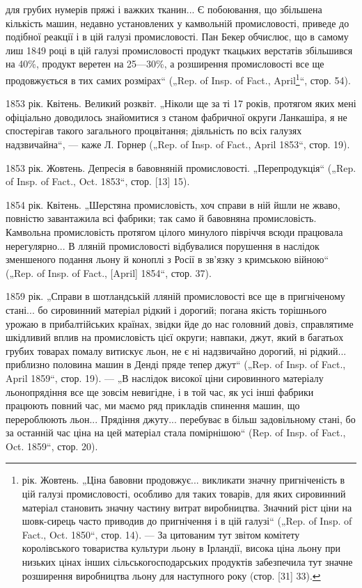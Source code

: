 \parcont{}  %
для грубих нумерів пряжі і важких тканин... Є побоювання, що
збільшена кількість машин, недавно установлених у камвольній
промисловості, приведе до подібної реакції і в цій галузі промисловості.
Пан Бекер обчислює, що в самому лиш 1849 році в цій
галузі промисловості продукт ткацьких верстатів збільшився на
40\%, продукт веретен на 25—30\%, а розширення промисловості
все ще продовжується в тих самих розмірах“ („Rep. of Insp.
of Fact., April\footnote{
рік. Жовтень. „Ціна бавовни продовжує... викликати
значну пригніченість в цій галузі промисловості, особливо для
таких товарів, для яких сировинний матеріал становить значну
частину витрат виробництва. Значний ріст ціни на шовк-сирець
часто приводив до пригнічення і в цій галузі“ („Rep. of Insp. of
Fact., Oct. 1850“, стор. 14). — За цитованим тут звітом комітету
королівського товариства культури льону в Ірландії, висока
ціна льону при низьких цінах інших сільськогосподарських продуктів
забезпечила тут значне розширення виробництва льону
для наступного року (стор. [31] 33).
}“, стор. 54).

1853 рік. Квітень. Великий розквіт. „Ніколи ще за ті 17 років,
протягом яких мені офіціально доводилось знайомитися з станом
фабричної округи Ланкашіра, я не спостерігав такого загального
процвітання; діяльність по всіх галузях надзвичайна“, —
каже Л. Горнер („Rep. of Insp. of Fact., April 1853“, стор. 19).

1853 рік. Жовтень. Депресія в бавовняній промисловості.
„Перепродукція“ („Rep. of Insp. of Fact., Oct. 1853“, стор. [13] 15).

1854 рік. Квітень. „Шерстяна промисловість, хоч справи в ній
йшли не жваво, повністю завантажила всі фабрики; так само
й бавовняна промисловість. Камвольна промисловість протягом
цілого минулого півріччя всюди працювала нерегулярно... В лляній
промисловості відбувалися порушення в наслідок зменшеного
подання льону й коноплі з Росії в зв’язку з кримською війною“
(„Rep. of Insp. of Fact., [April] 1854“, стор. 37).

1859 рік. „Справи в шотландській лляній промисловості все
ще в пригніченому стані... бо сировинний матеріал рідкий і дорогий;
погана якість торішнього урожаю в прибалтійських країнах,
звідки йде до нас головний довіз, справлятиме шкідливий вплив
на промисловість цієї округи; навпаки, джут, який в багатьох
грубих товарах помалу витискує льон, не є ні надзвичайно дорогий,
ні рідкий... приблизно половина машин в Денді пряде
тепер джут“ („Rep. of Insp. of Fact., April 1859“, стор. 19). —
„В наслідок високої ціни сировинного матеріалу льонопрядіння
все ще зовсім невигідне, і в той час, як усі інші фабрики працюють
повний час, ми маємо ряд прикладів спинення машин,
що перероблюють льон... Прядіння джуту... перебуває в більш
задовільному стані, бо за останній час ціна на цей матеріал
стала помірнішою“ (Rep. of Insp. of Fact., Oct. 1859“, стор. 20).
